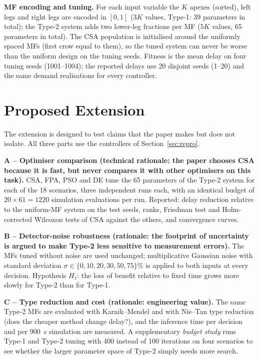 \textbf{MF encoding and tuning.} For each input variable the $K$ apexes (sorted), left legs and right legs are encoded in $[0,1]$ ($3K$ values, Type-1: 39 parameters in total); the Type-2 system adds two
lower-leg fractions per MF ($5K$ values, 65 parameters in total). The CSA population is initialised around the uniformly spaced MFs (first crow equal to them), so the tuned system can never be worse than the uniform design on the tuning seeds.
Fitness is the mean delay on four tuning seeds (1001--1004); the reported delays use 20 disjoint seeds (1--20) and the same demand realisations for every controller.

\section{Proposed Extension}
\label{sec:extension}
The extension is designed to test claims that the paper makes but does not isolate. All three parts use the controllers of Section~\ref{sec:repro}.

\textbf{A -- Optimiser comparison (technical rationale: the paper chooses CSA because it is fast, but never compares it with other optimisers on this task).}
CSA, FPA, PSO and DE tune the 65 parameters of the Type-2 system for each of the 18 scenarios, three independent runs each, with an identical budget of
$20\times61=1220$ simulation evaluations per run. Reported: delay reduction relative to the uniform-MF system on the test seeds, ranks, Friedman test and Holm-corrected Wilcoxon tests of CSA against the others,
and convergence curves.

\textbf{B -- Detector-noise robustness (rationale: the footprint of uncertainty is argued to make Type-2 less sensitive to measurement errors).}
The MFs tuned without noise are used unchanged; multiplicative Gaussian noise with standard deviation $\sigma\in\{0,10,20,30,50,75\}\%$ is applied to both inputs at every decision.
Hypothesis $H_1$: the loss of benefit relative to fixed time grows more slowly for Type-2 than for Type-1.

\textbf{C -- Type reduction and cost (rationale: engineering value).} The same Type-2 MFs are evaluated with Karnik--Mendel and with Nie--Tan type reduction (does the cheaper method change delay?),
and the inference time per decision and per 900~s simulation are measured. A supplementary \emph{budget study} runs Type-1 and Type-2 tuning with 400 instead of 100 iterations on four scenarios to see whether the
larger parameter space of Type-2 simply needs more search.

